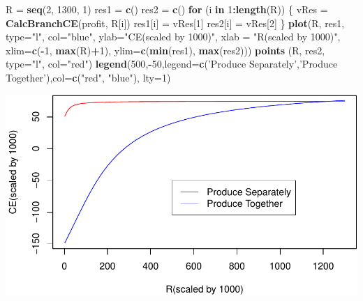 \documentclass[]{article}
\newenvironment{Shaded}{\begin{snugshade}}{\end{snugshade}}
\newcommand{\KeywordTok}[1]{\textcolor[rgb]{0.13,0.29,0.53}{\textbf{#1}}}
\newcommand{\DataTypeTok}[1]{\textcolor[rgb]{0.13,0.29,0.53}{#1}}
\newcommand{\DecValTok}[1]{\textcolor[rgb]{0.00,0.00,0.81}{#1}}
\newcommand{\StringTok}[1]{\textcolor[rgb]{0.31,0.60,0.02}{#1}}
\newcommand{\ControlFlowTok}[1]{\textcolor[rgb]{0.13,0.29,0.53}{\textbf{#1}}}
\newcommand{\OperatorTok}[1]{\textcolor[rgb]{0.81,0.36,0.00}{\textbf{#1}}}
\newcommand{\NormalTok}[1]{#1}
\begin{document}
\begin{Shaded}
\begin{Highlighting}[]
\NormalTok{R =}\StringTok{ }\KeywordTok{seq}\NormalTok{(}\DecValTok{2}\NormalTok{, }\DecValTok{1300}\NormalTok{, }\DecValTok{1}\NormalTok{)}
\NormalTok{res1 =}\StringTok{ }\KeywordTok{c}\NormalTok{()}
\NormalTok{res2 =}\StringTok{ }\KeywordTok{c}\NormalTok{()}
\ControlFlowTok{for}\NormalTok{ (i }\ControlFlowTok{in} \DecValTok{1}\OperatorTok{:}\KeywordTok{length}\NormalTok{(R)) \{}
\NormalTok{vRes =}\StringTok{ }\KeywordTok{CalcBranchCE}\NormalTok{(profit, R[i])}
\NormalTok{res1[i] =}\StringTok{ }\NormalTok{vRes[}\DecValTok{1}\NormalTok{]}
\NormalTok{res2[i] =}\StringTok{ }\NormalTok{vRes[}\DecValTok{2}\NormalTok{]}
\NormalTok{\}}
\KeywordTok{plot}\NormalTok{(R, res1, }\DataTypeTok{type=}\StringTok{"l"}\NormalTok{, }\DataTypeTok{col=}\StringTok{"blue"}\NormalTok{, }\DataTypeTok{ylab=}\StringTok{"CE(scaled by 1000)"}\NormalTok{, }\DataTypeTok{xlab =} \StringTok{"R(scaled by 1000)"}\NormalTok{,}
     \DataTypeTok{xlim=}\KeywordTok{c}\NormalTok{(}\OperatorTok{-}\DecValTok{1}\NormalTok{, }\KeywordTok{max}\NormalTok{(R)}\OperatorTok{+}\DecValTok{1}\NormalTok{), }\DataTypeTok{ylim=}\KeywordTok{c}\NormalTok{(}\KeywordTok{min}\NormalTok{(res1), }\KeywordTok{max}\NormalTok{(res2)))}
\KeywordTok{points}\NormalTok{ (R, res2, }\DataTypeTok{type=}\StringTok{"l"}\NormalTok{, }\DataTypeTok{col=}\StringTok{"red"}\NormalTok{)}
\KeywordTok{legend}\NormalTok{(}\DecValTok{500}\NormalTok{,}\OperatorTok{-}\DecValTok{50}\NormalTok{,}\DataTypeTok{legend=}\KeywordTok{c}\NormalTok{(}\StringTok{'Produce Separately'}\NormalTok{,}\StringTok{'Produce Together'}\NormalTok{),}\DataTypeTok{col=}\KeywordTok{c}\NormalTok{(}\StringTok{"red"}\NormalTok{, }\StringTok{"blue"}\NormalTok{), }\DataTypeTok{lty=}\DecValTok{1}\NormalTok{)}
\end{Highlighting}
\end{Shaded}

\includegraphics{Assignment1_files/figure-latex/interval of R-1.pdf}
\end{document}
